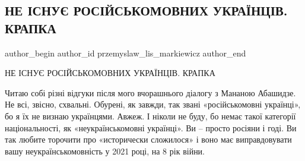  
 
 
 
 
 
\subsection{НЕ ІСНУЄ РОСІЙСЬКОМОВНИХ УКРАЇНЦІВ. КРАПКА}
\label{sec:22_10_2021.fb.przemyslaw_lis_markiewicz.1.rusjazyk_ukraincy}
 
\ifcmt
 author_begin
   author_id przemyslaw_lis_markiewicz
 author_end
\fi

НЕ ІСНУЄ РОСІЙСЬКОМОВНИХ УКРАЇНЦІВ. КРАПКА

Читаю собі різні відгуки після мого вчорашнього діалогу з Мананою Абашидзе. Не
всі, звісно, схвальні. Обурені, як завжди, так звані «російськомовні українці»,
бо я їх не визнаю українцями. Авжеж. І ніколи не буду, бо немає такої категорії
національності, як «неукраїнськомовні українці». Ви – просто росіяни і годі. Ви
так любите торочити про «исторически сложилося» і воно має виправдовувати вашу
неукраїнськомовність у 2021 році, на 8 рік війни.


